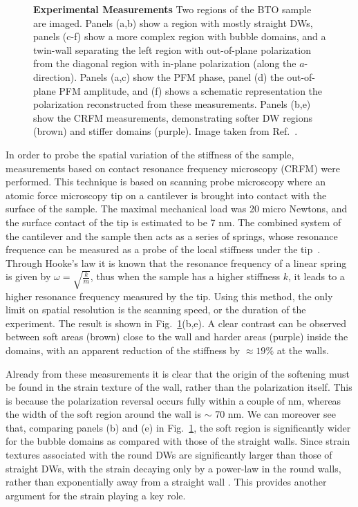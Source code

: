 \begin{figure}
	\caption{\label{fig:BTO_experiment} {\bf Experimental Measurements} Two regions of the BTO sample are imaged. Panels (a,b) show a region with mostly straight DWs, panels (c-f) show a more complex region with bubble domains, and a twin-wall separating the left region with out-of-plane polarization from the diagonal region with in-plane polarization (along the $a$-direction). Panels (a,c) show the PFM phase, panel (d) the out-of-plane PFM amplitude, and (f) shows a schematic representation the polarization reconstructed from these measurements. Panels (b,e) show the CRFM measurements, demonstrating softer DW regions (brown) and stiffer domains (purple). Image taken from Ref.~\cite{Stefani2020}.}
\end{figure}

In order to probe the spatial variation of the stiffness of the sample, measurements based on contact resonance frequency microscopy (CRFM) were performed.
This technique is based on scanning probe microscopy where an atomic force microscopy tip on a cantilever is brought into contact with the surface of the sample.
The maximal mechanical load was 20 micro Newtons, and the surface contact of the tip is estimated to be 7 nm.
The combined system of the cantilever and the sample then acts as a series of springs, whose resonance frequence can be measured as a probe of the local stiffness under the tip~\cite{Rabe2000}.
Through Hooke's law it is known that the resonance frequency of a linear spring is given by $\omega = \sqrt{\frac{k}{m}}$, thus when the sample has a higher stiffness $k$, it leads to a higher resonance frequency measured by the tip.
Using this method, the only limit on spatial resolution is the scanning speed, or the duration of the experiment.
The result is shown in Fig.~\ref{fig:BTO_experiment}(b,e).
A clear contrast can be observed between soft areas (brown) close to the wall and harder areas (purple) inside the domains, with an apparent reduction of the stiffness by $\approx 19\%$ at the walls.


Already from these measurements it is clear that the origin of the softening must be found in the strain texture of the wall, rather than the polarization itself.
This is because the polarization reversal occurs fully within a couple of nm, whereas the width of the soft region around the wall is $\sim$ 70 nm.
We can moreover see that, comparing panels (b) and (e) in Fig.~\ref{fig:BTO_experiment}, the soft region is significantly wider for the bubble domains as compared with those of the straight walls.
Since strain textures associated with the round DWs are significantly larger than those of straight DWs, with the strain decaying only by a power-law in the round walls, rather than exponentially away from a straight wall \cite{Landau1960}.
This provides another argument for the strain playing a key role.

